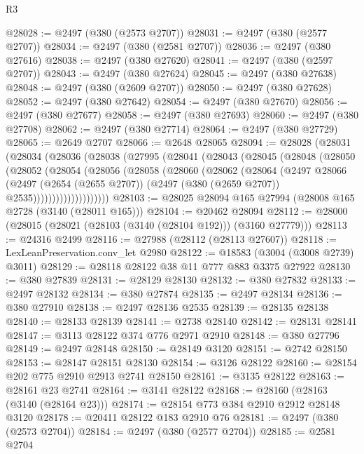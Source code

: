 \begin{lexlean}{R3}
\begin{coremodule}
@28028 := @2497 (@380 (@2573 @2707))
@28031 := @2497 (@380 (@2577 @2707))
@28034 := @2497 (@380 (@2581 @2707))
@28036 := @2497 (@380 @27616)
@28038 := @2497 (@380 @27620)
@28041 := @2497 (@380 (@2597 @2707))
@28043 := @2497 (@380 @27624)
@28045 := @2497 (@380 @27638)
@28048 := @2497 (@380 (@2609 @2707))
@28050 := @2497 (@380 @27628)
@28052 := @2497 (@380 @27642)
@28054 := @2497 (@380 @27670)
@28056 := @2497 (@380 @27677)
@28058 := @2497 (@380 @27693)
@28060 := @2497 (@380 @27708)
@28062 := @2497 (@380 @27714)
@28064 := @2497 (@380 @27729)
@28065 := @2649 @2707
@28066 := @2648 @28065
@28094 := @28028
    (@28031
      (@28034
        (@28036
          (@28038
            (@27995
              (@28041
                (@28043
                  (@28045
                    (@28048
                      (@28050
                        (@28052
                          (@28054
                            (@28056
                              (@28058
                                (@28060
                                  (@28062
                                    (@28064
                                      (@2497
                                        @28066
                                        (@2497
                                          (@2654 (@2655 @2707))
                                          (@2497 (@380 (@2659 @2707)) @2535))))))))))))))))))))
@28103 := @28025 @28094 @165 @27994 (@28008 @165 @2728 (@3140 (@28011 @165)))
@28104 := @20462 @28094
@28112 := @28000 (@28015 (@28021 (@28103 (@3140 (@28104 @192))) (@3160 @27779)))
@28113 := @24316 @2499
@28116 := @27988 (@28112 (@28113 @27607))
@28118 := LexLeanPreservation.conv_let @2980
@28122 := @18583 (@3004 (@3008 @2739) @3011)
@28129 := @28118 @28122 @38 @11 @777 @883 @3375 @27922
@28130 := @380 @27839
@28131 := @28129 @28130
@28132 := @380 @27832
@28133 := @2497 @28132
@28134 := @380 @27874
@28135 := @2497 @28134
@28136 := @380 @27910
@28138 := @2497 @28136 @2535
@28139 := @28135 @28138
@28140 := @28133 @28139
@28141 := @2738 @28140
@28142 := @28131 @28141
@28147 := @3113 @28122 @374 @776 @2971 @2910
@28148 := @380 @27796
@28149 := @2497 @28148
@28150 := @28149 @3120
@28151 := @2742 @28150
@28153 := @28147 @28151 @28130
@28154 := @3126 @28122
@28160 := @28154 @202 @775 @2910 @2913 @2741 @28150
@28161 := @3135 @28122
@28163 := @28161 @23 @2741
@28164 := @3141 @28122
@28168 := @28160 (@28163 (@3140 (@28164 @23)))
@28174 := @28154 @773 @384 @2910 @2912 @28148 @3120
@28178 := @20411 @28122 @183 @2910 @76
@28181 := @2497 (@380 (@2573 @2704))
@28184 := @2497 (@380 (@2577 @2704))
@28185 := @2581 @2704

\end{coremodule}
\end{lexlean}
